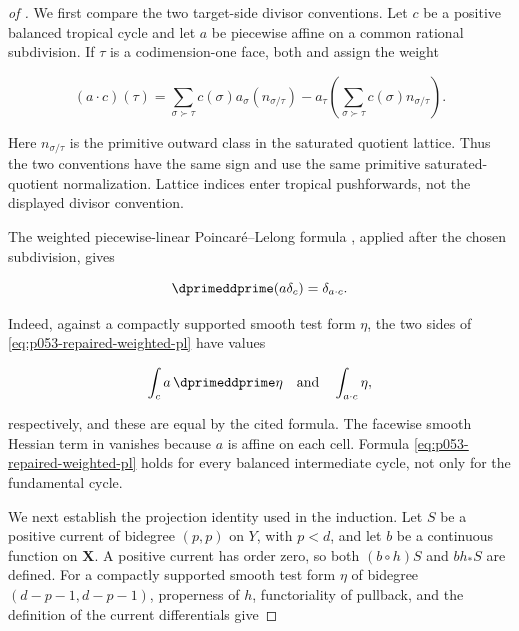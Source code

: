 \begin{proof}[of
]
We first compare the two target-side divisor conventions.  Let \(c\) be a
positive balanced tropical cycle and let \(a\) be piecewise affine on a
common rational subdivision.  If \(\tau\) is a codimension-one face, both
\cite[Definition~1.10]{GK17} and \cite[Definition~2.31]{BMPS26} assign the
weight

\begin{equation}
 (a\cdot c)(\tau)
 =\sum_{\sigma\succ\tau}c(\sigma)
       a_\sigma(n_{\sigma/\tau})
  -a_\tau\!\left(
       \sum_{\sigma\succ\tau}c(\sigma)n_{\sigma/\tau}
    \right).
 \label{eq:p053-repaired-weight-match}
\end{equation}

Here \(n_{\sigma/\tau}\) is the primitive outward class in the saturated
quotient lattice.  Thus the two conventions have the same sign and use the
same primitive saturated-quotient normalization.  Lattice indices enter
tropical pushforwards, not the displayed divisor convention.

The weighted piecewise-linear Poincar\'e--Lelong formula
\cite[Corollary~3.20]{GK17}, applied after the chosen subdivision, gives

\begin{equation}
 \dprimeddprime(a\delta_c)=\delta_{a\cdot c}.
 \label{eq:p053-repaired-weighted-pl}
\end{equation}

Indeed, against a compactly supported smooth test form \(\eta\), the two
sides of \eqref{eq:p053-repaired-weighted-pl} have values

\[
 \int_c a\,\dprimeddprime\eta
 \quad\text{and}\quad
 \int_{a\cdot c}\eta,
\]

respectively, and these are equal by the cited formula.  The facewise smooth
Hessian term in \cite[Theorem~3.16]{GK17} vanishes because \(a\) is affine on
each cell.  Formula \eqref{eq:p053-repaired-weighted-pl} holds for every
balanced intermediate cycle, not only for the fundamental cycle.

We next establish the projection identity used in the induction.  Let \(S\)
be a positive current of bidegree \((p,p)\) on \(Y\), with \(p<d\), and let
\(b\) be a continuous function on \(\mathbf X\).  A positive current has
order zero, so both \((b\circ h)S\) and \(b h_*S\) are defined.  For a
compactly supported smooth test form \(\eta\) of bidegree
\((d-p-1,d-p-1)\), properness of \(h\), functoriality of pullback, and the
definition of the current differentials give


\end{proof}
